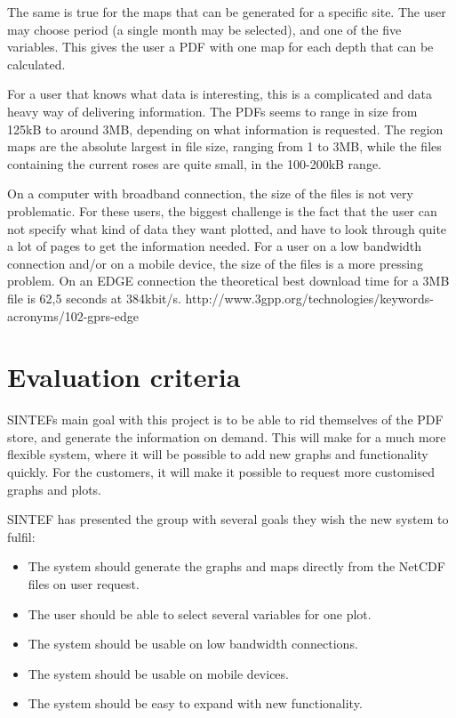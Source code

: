 \documentclass[11pt,a4paper,titlepage,oneside]{report}
\begin{document}
The same is true for the maps that can be generated for a specific site. The user may choose period (a single month may be selected), and one of the five variables. This gives the user a PDF with one map for each depth that can be calculated. 

For a user that knows what data is interesting, this is a complicated and data heavy way of delivering information. The PDFs seems to range in size from 125kB to around 3MB, depending on what information is requested. The region maps are the absolute largest in file size, ranging from 1 to 3MB, while the files containing the current roses are quite small, in the 100-200kB range. 

On a computer with broadband connection, the size of the files is not very problematic. For these users, the biggest challenge is the fact that the user can not specify what kind of data they want plotted, and have to look through quite a lot of pages to get the information needed. For a user on a low bandwidth connection and/or on a mobile device, the size of the files is a more pressing problem. On an EDGE connection the theoretical best download time for a 3MB file is 62,5 seconds at 384kbit/s.
http://www.3gpp.org/technologies/keywords-acronyms/102-gprs-edge

\section{Evaluation criteria}
SINTEFs main goal with this project is to be able to rid themselves of the PDF store, and generate the information on demand. This will make for a much more flexible system, where it will be possible to add new graphs and functionality quickly. For the customers, it will make it possible to request more customised graphs and plots.

SINTEF has presented the group with several goals they wish the new system to fulfil:

\begin{itemize}
\item The system should generate the graphs and maps directly from the NetCDF files on user request.
\item The user should be able to select several variables for one plot.
\item The system should be usable on low bandwidth connections.
\item The system should be usable on mobile devices.
\item The system should be easy to expand with new functionality.
\end{itemize} 
\end{document}
